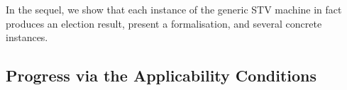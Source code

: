 \documentclass{llncs}
\begin{document}

\noindent
In the sequel, we show that each instance of the generic STV machine
in fact produces an election result, present a formalisation, and
several concrete instances.

\subsection{Progress via the  Applicability Conditions}
  
\end{document}
